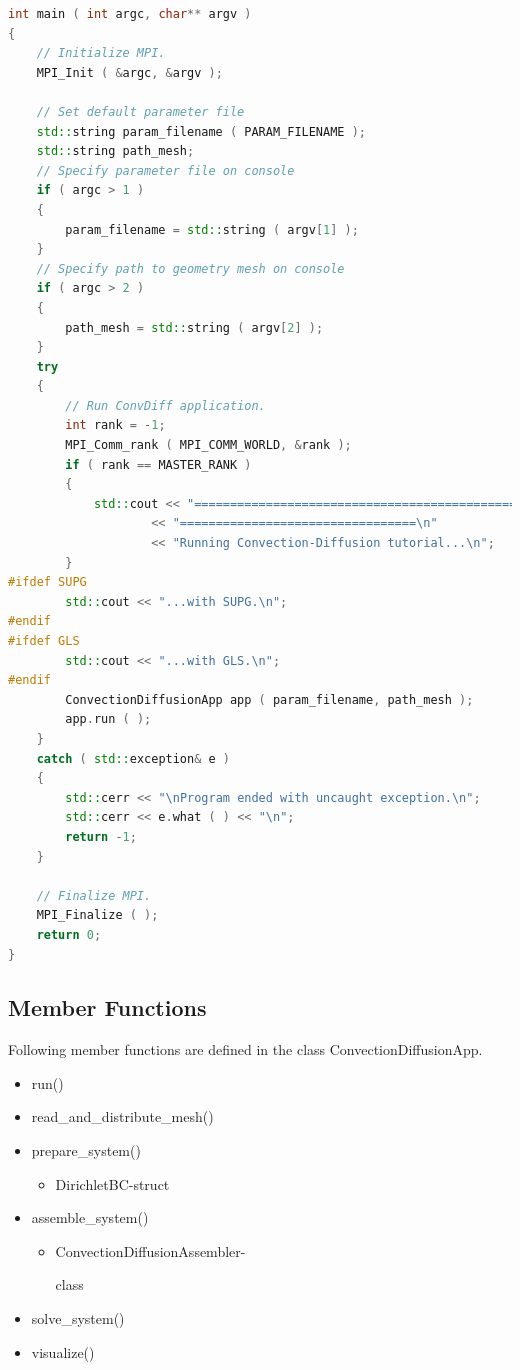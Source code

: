 \documentclass[a4paper, 11pt, twoside]{article}
\begin{document}
\begin{lstlisting}[language=C++, basicstyle={\footnotesize, \ttfamily}, keywordstyle=\color{blue},  numbers=none, tabsize=4]
int main ( int argc, char** argv )
{
    // Initialize MPI.
    MPI_Init ( &argc, &argv );

    // Set default parameter file
    std::string param_filename ( PARAM_FILENAME );
    std::string path_mesh;
    // Specify parameter file on console
    if ( argc > 1 )
    {
        param_filename = std::string ( argv[1] );
    }
    // Specify path to geometry mesh on console
    if ( argc > 2 )
    {
        path_mesh = std::string ( argv[2] );
    }
    try
    {
        // Run ConvDiff application.
        int rank = -1;
        MPI_Comm_rank ( MPI_COMM_WORLD, &rank );
        if ( rank == MASTER_RANK )
        {
            std::cout << "==============================================="
                    << "=================================\n"
                    << "Running Convection-Diffusion tutorial...\n";
        }
#ifdef SUPG
        std::cout << "...with SUPG.\n";
#endif
#ifdef GLS
        std::cout << "...with GLS.\n";
#endif
        ConvectionDiffusionApp app ( param_filename, path_mesh );
        app.run ( );
    }
    catch ( std::exception& e )
    {
        std::cerr << "\nProgram ended with uncaught exception.\n";
        std::cerr << e.what ( ) << "\n";
        return -1;
    }

    // Finalize MPI.
    MPI_Finalize ( );
    return 0;
}
\end{lstlisting}

\subsection{Member Functions}
Following member functions are defined in the class ConvectionDiffusionApp.
\begin{itemize}
 \item run()
 \item read\_and\_distribute\_mesh()
 \item prepare\_system()
 \begin{itemize}
 \item DirichletBC-struct
 \end{itemize}
 \item assemble\_system()
 \begin{itemize}
 \item ConvectionDiffusionAssembler-\begin{scriptsize}
class
\end{scriptsize}
 \end{itemize}
 \item solve\_system()
 \item visualize()
\end{itemize}
\end{document}
